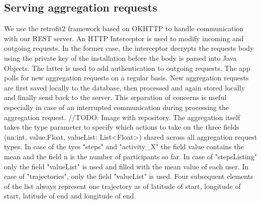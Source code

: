 \subsection{Serving aggregation requests}
We use the retrofit2 framework based on OKHTTP to handle communication with our REST server. An HTTP Interceptor is used to modify incoming and outgoing requests. In the former case, the interceptor decrypts the requests body using the private key of the installation before the body is parsed into Java Objects. The latter is used to add authentication to outgoing requests.
The app polls for new aggregation requests on a regular basis. New aggregation requests are first saved locally to the database, then processed and again stored locally and finally send back to the server. This separation of concerns is useful especially in case of an interrupted communication during processing the aggregation request. //TODO: Image with repository.
The aggregation itself takes the type parameter to specify which actions to take on the three fields (nn:int, value:Float, valueList: List<Float>) shared across all aggregation request types. In case of the tyes "steps" and "activity\_X" the field value contains the mean and the field n is the number of participants so far. In case of "stepsListing" only the field "valueList" is used and filled with the mean value of each user. In case of "trajectories", only the field "valueList" is used. Four subsequent elements of the list always represent one trajectory as of latitude of start, longitude of start, latitude of end and longitude of end.
